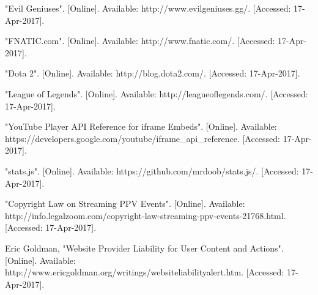 \documentclass[conference]{IEEEtran}
\begin{document}
%
%
%

\begin{thebibliography}{1}

    "Evil Geniuses". [Online]. Available: http://www.evilgeniuses.gg/. [Accessed: 17-Apr-2017].

    "FNATIC.com". [Online]. Available: http://www.fnatic.com/. [Accessed: 17-Apr-2017].

    "Dota 2". [Online]. Available: http://blog.dota2.com/. [Accessed: 17-Apr-2017].

    "League of Legends". [Online]. Available: http://leagueoflegends.com/. [Accessed: 17-Apr-2017].

    "YouTube Player API Reference for iframe Embeds". [Online]. Available: https://developers.google.com/youtube/iframe\_api\_reference. [Accessed: 17-Apr-2017]. 

    "stats.js". [Online]. Available: https://github.com/mrdoob/stats.js/. [Accessed: 17-Apr-2017].

    "Copyright Law on Streaming PPV Events". [Online]. Available: http://info.legalzoom.com/copyright-law-streaming-ppv-events-21768.html. [Accessed: 17-Apr-2017].

    Eric Goldman, "Website Provider Liability for User Content and Actions". [Online]. Available: http://www.ericgoldman.org/writings/websiteliabilityalert.htm. [Accessed: 17-Apr-2017].

\end{thebibliography}
\end{document}
